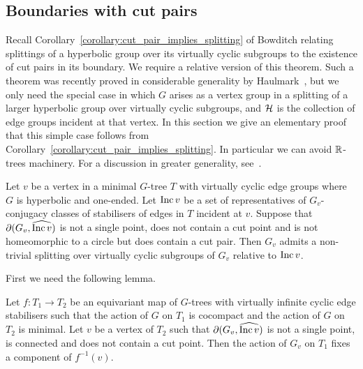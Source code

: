 \subsection{Boundaries with cut pairs}

Recall Corollary~\ref{corollary:cut_pair_implies_splitting} of Bowditch relating splittings of a hyperbolic group over its virtually cyclic subgroups to the existence of cut pairs in its boundary.
We require a relative version of this theorem. 
Such a theorem was recently proved in considerable generality by Haulmark~\cite{haulmark17}, but we only need the special case in which $G$ arises as a vertex group in a splitting of a larger hyperbolic group over virtually cyclic subgroups, and $\mathcal{H}$ is the collection of edge groups incident at that vertex. 
In this section we give an elementary proof that this simple case follows from Corollary~\ref{corollary:cut_pair_implies_splitting}.
In particular we can avoid $\mathbb{R}$-trees machinery. 
For a discussion in greater generality, see~\cite{groff13}.

\begin{proposition}\label{proposition:cut_pair_implies_relative_splitting} 
  Let $v$ be a vertex in a minimal $G$-tree $T$ with virtually cyclic edge groups where $G$ is hyperbolic and one-ended. 
  Let $\operatorname{\mathrm{Inc}} v$ be a set of representatives of $G_v$-conjugacy classes of stabilisers of edges in $T$ incident at $v$.  
  Suppose that $\partial(G_v, \widehat{\operatorname{\mathrm{Inc}} v})$ is not a single point, does not contain a cut point and is not homeomorphic to a circle but does contain a cut pair. 
  Then $G_v$ admits a non-trivial splitting over virtually cyclic subgroups of $G_v$ relative to $\operatorname{\mathrm{Inc}} v$. 
\end{proposition}

First we need the following lemma. 

\begin{lemma}\label{lemma:fixed_component} 
  Let $f \colon T_1 \to T_2$ be an equivariant map of $G$-trees with virtually infinite cyclic edge stabilisers such that the action of $G$ on $T_1$ is cocompact and the action of $G$ on $T_2$ is minimal.  
  Let $v$ be a vertex of $T_2$ such that $\partial(G_v, \widehat{\operatorname{\mathrm{Inc}} v})$ is not a single point, is connected and does not contain a cut point. 
  Then the action of $G_v$ on $T_1$ fixes a component of $f^{-1}(v)$.
\end{lemma}

